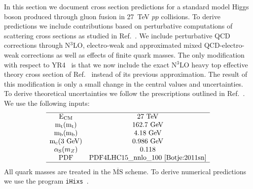 \label{sec:he-lhc-ggF}
In this section we document cross section predictions for a standard
model Higgs boson produced through gluon fusion in 27~TeV $pp$ collisions.  To
derive predictions we include contributions based on perturbative
computations of scattering cross sections as studied in
Ref.~\cite{Anastasiou:2016cez}.  We include perturbative QCD
corrections through N$^3$LO, electro-weak and approximated mixed
QCD-electro-weak corrections as well as effects of finite quark
masses. The only modification with respect to YR4~\cite{deFlorian:2016spz} is that we
now include the exact N$^3$LO heavy top effective theory cross section of
Ref.~\cite{Mistlberger:2018etf} instead of its previous approximation. The
result of this modification is only a small change in the central values and
uncertainties. To derive theoretical uncertainties we follow the
prescriptions outlined in Ref.~\cite{Anastasiou:2016cez}.
We use the following inputs:
\begin{equation}
\begin{array}{c  c}
\hline
\text{E}_\text{CM} & 27~\text{TeV} \\
\text{m}_\text{t}(\text{m}_\text{t}) & 162.7~\text{GeV} \\
\text{m}_\text{b}(\text{m}_\text{b}) & 4.18~\text{GeV} \\
\text{m}_\text{c}(3 \text{ GeV}) & 0.986~\text{GeV} \\
\alpha_\text{S} (m_Z) & 0.118  \\
\text{PDF} & \text{PDF4LHC15\_nnlo\_100}\text{~\cite{Botje:2011sn}}\\
\hline
\end{array}
\end{equation}
All quark masses are treated in the $\overline{\text{MS}}$ scheme. To derive numerical predictions we use the program \texttt{iHixs}~\cite{Dulat:2018rbf}.

